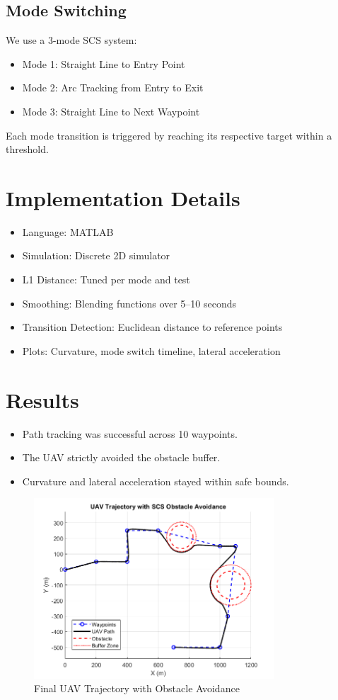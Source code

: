 \documentclass[12pt]{article}
\begin{document}
\subsection{Mode Switching}
We use a 3-mode SCS system:
\begin{itemize}
  \item Mode 1: Straight Line to Entry Point
  \item Mode 2: Arc Tracking from Entry to Exit
  \item Mode 3: Straight Line to Next Waypoint
\end{itemize}
Each mode transition is triggered by reaching its respective target within a threshold.

\section{Implementation Details}
\begin{itemize}
  \item Language: MATLAB
  \item Simulation: Discrete 2D simulator
  \item L1 Distance: Tuned per mode and test
  \item Smoothing: Blending functions over 5–10 seconds
  \item Transition Detection: Euclidean distance to reference points
  \item Plots: Curvature, mode switch timeline, lateral acceleration
\end{itemize}

\section{Results}
\begin{itemize}
  \item Path tracking was successful across 10 waypoints.
  \item The UAV strictly avoided the obstacle buffer.
  \item Curvature and lateral acceleration stayed within safe bounds.
\end{itemize}

\begin{figure}[H]
  \centering
  \includegraphics[width=0.8\textwidth]{images/Final_work1.png}
  \caption{Final UAV Trajectory with Obstacle Avoidance}
\end{figure}
\end{document}
